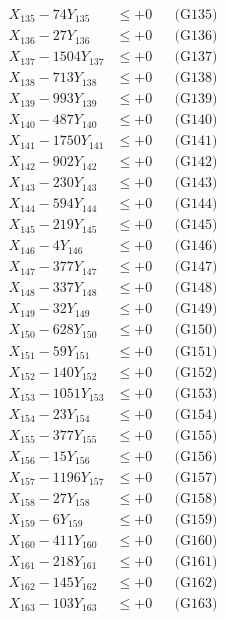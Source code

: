 \documentclass[a4paper,10pt]{article}
\begin{document}
{\begin{align}
X_{135} - 74Y_{135} &\leq +0 && \text{(G135)} \\
X_{136} - 27Y_{136} &\leq +0 && \text{(G136)} \\
X_{137} - 1504Y_{137} &\leq +0 && \text{(G137)} \\
X_{138} - 713Y_{138} &\leq +0 && \text{(G138)} \\
X_{139} - 993Y_{139} &\leq +0 && \text{(G139)} \\
X_{140} - 487Y_{140} &\leq +0 && \text{(G140)} \\
\allowbreak
X_{141} - 1750Y_{141} &\leq +0 && \text{(G141)} \\
X_{142} - 902Y_{142} &\leq +0 && \text{(G142)} \\
X_{143} - 230Y_{143} &\leq +0 && \text{(G143)} \\
X_{144} - 594Y_{144} &\leq +0 && \text{(G144)} \\
X_{145} - 219Y_{145} &\leq +0 && \text{(G145)} \\
X_{146} - 4Y_{146} &\leq +0 && \text{(G146)} \\
X_{147} - 377Y_{147} &\leq +0 && \text{(G147)} \\
X_{148} - 337Y_{148} &\leq +0 && \text{(G148)} \\
X_{149} - 32Y_{149} &\leq +0 && \text{(G149)} \\
X_{150} - 628Y_{150} &\leq +0 && \text{(G150)} \\
\allowbreak
X_{151} - 59Y_{151} &\leq +0 && \text{(G151)} \\
X_{152} - 140Y_{152} &\leq +0 && \text{(G152)} \\
X_{153} - 1051Y_{153} &\leq +0 && \text{(G153)} \\
X_{154} - 23Y_{154} &\leq +0 && \text{(G154)} \\
X_{155} - 377Y_{155} &\leq +0 && \text{(G155)} \\
X_{156} - 15Y_{156} &\leq +0 && \text{(G156)} \\
X_{157} - 1196Y_{157} &\leq +0 && \text{(G157)} \\
X_{158} - 27Y_{158} &\leq +0 && \text{(G158)} \\
X_{159} - 6Y_{159} &\leq +0 && \text{(G159)} \\
X_{160} - 411Y_{160} &\leq +0 && \text{(G160)} \\
\allowbreak
X_{161} - 218Y_{161} &\leq +0 && \text{(G161)} \\
X_{162} - 145Y_{162} &\leq +0 && \text{(G162)} \\
X_{163} - 103Y_{163} &\leq +0 && \text{(G163)} \\

\end{align}}
\end{document}
